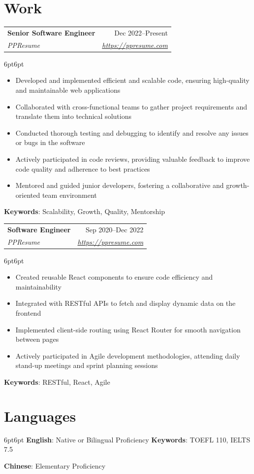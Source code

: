 \documentclass[a4paper,10pt]{article}
\makeatletter
\newcommand{\resumeSubheading}[4]{
  \begin{tabular*}{\textwidth}[t]{l@{\extracolsep{\fill}}r}
    \textbf{#1} & #2 \\
    \textit{#3} & \textit{#4} \\
  \end{tabular*}
}
\makeatother
\begin{document}
\section{Work}
\resumeSubheading
{Senior Software Engineer}{Dec 2022–Present}
{PPResume}{\url{https://ppresume.com}}
\begin{adjustwidth}{6pt}{6pt}
\begin{itemize}
\item Developed and implemented efficient and scalable code, ensuring high-quality and maintainable web applications
\item Collaborated with cross-functional teams to gather project requirements and translate them into technical solutions
\item Conducted thorough testing and debugging to identify and resolve any issues or bugs in the software
\item Actively participated in code reviews, providing valuable feedback to improve code quality and adherence to best practices
\item Mentored and guided junior developers, fostering a collaborative and growth-oriented team environment
\end{itemize}
\textbf{Keywords}: Scalability, Growth, Quality, Mentorship
\end{adjustwidth}

\resumeSubheading
{Software Engineer}{Sep 2020–Dec 2022}
{PPResume}{\url{https://ppresume.com}}
\begin{adjustwidth}{6pt}{6pt}
\begin{itemize}
\item Created reusable React components to ensure code efficiency and maintainability
\item Integrated with RESTful APIs to fetch and display dynamic data on the frontend
\item Implemented client-side routing using React Router for smooth navigation between pages
\item Actively participated in Agile development methodologies, attending daily stand-up meetings and sprint planning sessions
\end{itemize}
\textbf{Keywords}: RESTful, React, Agile
\end{adjustwidth}
\section{Languages}
\begin{adjustwidth}{6pt}{6pt}
\textbf{English}: Native or Bilingual Proficiency \hfill \textbf{Keywords}: TOEFL 110, IELTS 7.5

\textbf{Chinese}: Elementary Proficiency
\end{adjustwidth}
\end{document}
